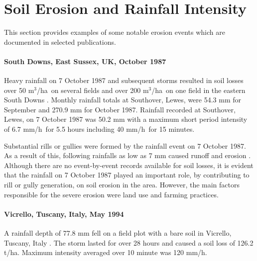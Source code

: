 \section{Soil Erosion and Rainfall Intensity}
\label{sec:RainfallIntensityAndSoilErosion}

This section provides examples of some notable erosion events which are
documented in selected publications.



\paragraph{South Downs, East Sussex, UK, October 1987
\citep{boardman1988-333}}
\label{sec:SouthDownsOctober1987}

Heavy rainfall on 7 October 1987 and subsequent storms resulted in soil losses
over 50 m$^3$/ha\ on several fields and over 200 m$^3$/ha\ on one field in the
eastern South Downs \citep{boardman1988-333}. Monthly rainfall totals at
Southover, Lewes, were 54.3 mm for September and 270.9 mm for October 1987.
Rainfall recorded at Southover, Lewes, on 7 October 1987 was 50.2 mm with a
maximum short period intensity of 6.7 mm/h\ for 5.5 hours including 40 mm/h\ for
15 minutes.

Substantial rills or gullies were formed by the rainfall event on 7 October
1987. As a result of this, following rainfalls as low as 7 mm caused runoff and
erosion \citep{boardman1988-333}.
Although there are no event-by-event records available for soil losses, it is
evident that the rainfall on 7 October 1987 played an important role, by
contributing to rill or gully generation, on  soil erosion in the area. However,
the main factors responsible for the severe erosion were land use and farming
practices.

\paragraph{Vicrello, Tuscany, Italy, May 1994 \citep{torri1999-131}}
\label{sec:VicrelloVolterraTuscany}

A rainfall depth of 77.8 mm fell on a field plot with a bare soil in Vicrello,
Tuscany, Italy \citep{torri1999-131}. The storm lasted for over 28 hours and
caused a soil loss of 126.2 t/ha. Maximum intensity averaged over 10 minute was
120 mm/h.

